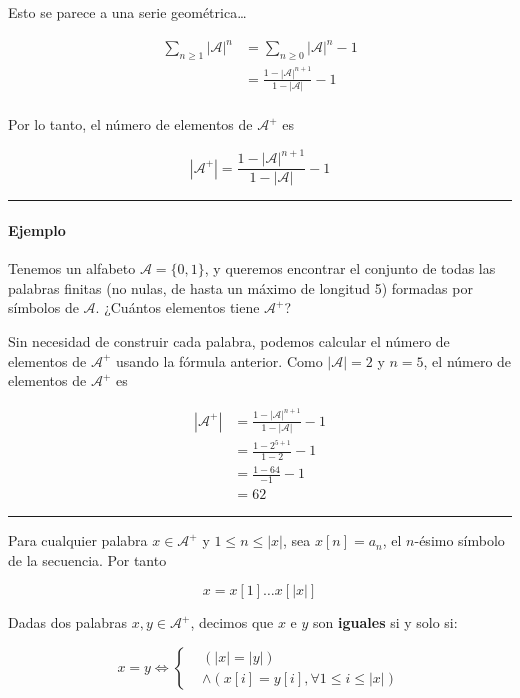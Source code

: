 Esto se parece a una serie geométrica\ldots{}


\begin{align*}
\sum_{n\geq 1}|\mathcal{A}|^n&=\sum_{n\geq 0}|\mathcal{A}|^n - 1\\
&=\frac{1-|\mathcal{A}|^{n+1}}{1-|\mathcal{A}|} - 1\\
\end{align*}


Por lo tanto, el número de elementos de \(\mathcal{A}^+\) es

\[
|\mathcal{A}^+|=\frac{1-|\mathcal{A}|^{n+1}}{1-|\mathcal{A}|} - 1
\]

\begin{center}\rule{0.5\linewidth}{0.5pt}\end{center}

\paragraph{Ejemplo}\label{ejemplo-1-estructura-del-lenguaje}

Tenemos un alfabeto \(\mathcal{A}=\{0,1\}\), y queremos encontrar el
conjunto de todas las palabras finitas (no nulas, de hasta un máximo de
longitud 5) formadas por símbolos de \(\mathcal{A}\). ¿Cuántos elementos
tiene \(\mathcal{A}^+\)?

Sin necesidad de construir cada palabra, podemos calcular el número de
elementos de \(\mathcal{A}^+\) usando la fórmula anterior. Como
\(|\mathcal{A}|=2\) y \(n=5\), el número de elementos de
\(\mathcal{A}^+\) es


\begin{align*}
|\mathcal{A}^+|&=\frac{1-|\mathcal{A}|^{n+1}}{1-|\mathcal{A}|} - 1\\
&=\frac{1-2^{5+1}}{1-2} - 1\\
&=\frac{1-64}{-1} - 1\\
&=62
\end{align*}


\begin{center}\rule{0.5\linewidth}{0.5pt}\end{center}

Para cualquier palabra \(x\in\mathcal{A}^+\) y \(1\leq n\leq|x|\), sea
\(x[n]=a_n\), el \(n\)-ésimo símbolo de la secuencia. Por tanto

\[
x=x[1]\dots x[|x|]
\]

Dadas dos palabras \(x,y\in\mathcal{A}^+\), decimos que \(x\) e \(y\)
son \textbf{iguales} si y solo si:

\[
x = y \Leftrightarrow\begin{cases}
&\left(|x|=|y|\right)\\
&\wedge\left(x[i]=y[i], \forall 1\leq i\leq|x|\right)
\end{cases}
\]

